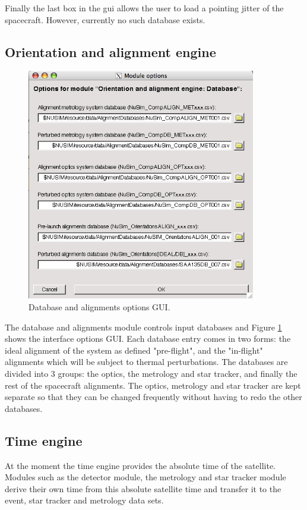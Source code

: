 Finally the last box in the gui allows the user to load a pointing jitter of the spacecraft. However, currently no such database exists.

\subsection{Orientation and alignment engine}
\begin{figure}[tb]
\begin{center}
\includegraphics[width=10cm]{images/DBgui.png}  
\caption{Database and alignments options GUI.}
\label{dbgui} 
\end{center}
\end{figure}

The database and alignments module controls input databases and Figure \ref{dbgui} shows the interface options GUI. Each database entry comes in two forms: the ideal alignment of the system as defined "pre-flight", and the "in-flight" alignments which will be subject to thermal perturbations. The databases are divided into 3 groups: the optics, the metrology and star tracker, and finally the rest of the spacecraft alignments. The optics, metrology and star tracker are kept separate so that they can be changed frequently without having to redo the other databases.

\subsection{Time engine}
At the moment the time engine provides the absolute time of the satellite. Modules such as the detector module, the metrology and star tracker module derive their own time from this absolute satellite time and transfer it to the event, star tracker and metrology data sets.   


